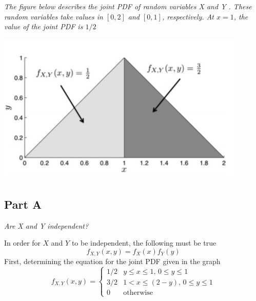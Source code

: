 \documentclass{article}
\begin{document}
\textit{The figure below describes the joint PDF of random variables X and Y
. These random variables take values in $[0, 2]$ and $[0, 1]$, respectively.
At $x = 1$, the value of the joint PDF is $1/2$}

\begin{center}
    \includegraphics[scale=1]{Images/P4.PNG}
\end{center}

\subsection*{Part A}

\textit{Are X and Y independent?}

\bigbreak

In order for $X$ and $Y$ to be independent, the following must be true
$$ f_{X,Y}(x,y) = f_X(x) f_Y(y) $$
First, determining the equation for the joint PDF given in the graph
$$ f_{X,Y}(x,y) = \begin{cases}
    1/2 & y \leq x \leq 1,\, 0 \leq y \leq 1 \\
    3/2 & 1 < x \leq (2 - y),\, 0 \leq y \leq 1 \\
    0 & \mathrm{otherwise}
\end{cases} $$
\end{document}
